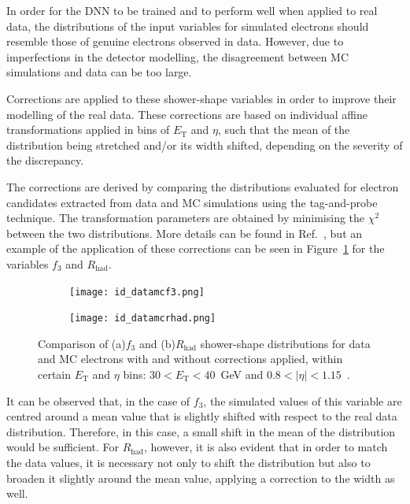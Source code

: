 In order for the DNN to be trained and to perform well when applied to real data, the distributions of the input variables for simulated electrons should resemble those of genuine electrons observed in data. However, due to imperfections in the detector modelling, the disagreement between MC simulations and data can be too large. %

Corrections are applied to these shower-shape variables in order to improve their modelling of the real data. These corrections are based on individual affine transformations applied in bins of $E_{\text{T}}$ and $\eta$, such that the mean of the distribution being stretched and/or its width shifted, depending on the severity of the discrepancy.

The corrections are derived by comparing the distributions evaluated for \zee electron candidates extracted from data and MC simulations using the tag-and-probe technique. The transformation parameters are obtained by minimising the $\chi^2$ between the two distributions. More details can be found in Ref.~\cite{Aaboud:2657964}, but an example of the application of these corrections can be seen in Figure~\ref{fig:corrected} for the variables $f_{3}$ and $R_{\text{had}}$.


\begin{figure}[htbp]
  \centering
  \begin{subfigure}[b]{0.48\textwidth}
      \texttt{[image: id\_datamcf3.png]}
      \caption{}
  \end{subfigure}
  \hfill
  \begin{subfigure}[b]{0.48\textwidth}
      \texttt{[image: id\_datamcrhad.png]}
      \caption{}
  \end{subfigure}
  \hfill
  \caption{Comparison of (a)$f_{3}$ and (b)$R_{\text{had}}$ shower-shape distributions for data and MC electrons with and without corrections applied, within certain $E_{\text{T}}$ and $\eta$ bins: $30 < E_{\text{T}} < 40$~GeV and $0.8<|\eta|<1.15$~\cite{Aaboud:2657964}.}
  \label{fig:corrected}
\end{figure}

It can be observed that, in the case of $f_3$, the simulated values of this variable are centred around a mean value that is slightly shifted with respect to the real data distribution. Therefore, in this case, a small shift in the mean of the distribution would be sufficient. 
For $R_{\text{had}}$, however, it is also evident that in order to match the data values, it is necessary not only to shift the distribution but also to broaden it slightly around the mean value, applying a correction to the width as well.

